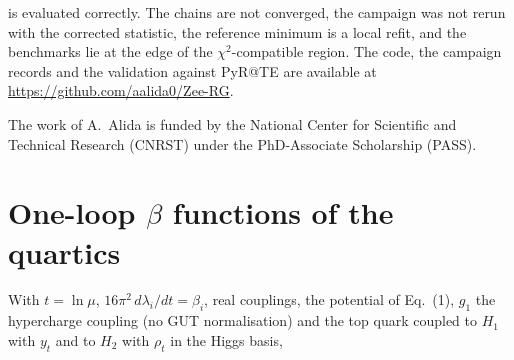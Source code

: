 \documentclass[twocolumn,epjc3]{svjour3}
\begin{document}
is evaluated correctly. The chains are not converged, the campaign was not rerun with the corrected statistic, the reference minimum is a local refit, and the benchmarks lie at the edge of the $\chi^2$-compatible region. The code, the campaign records and the validation against PyR@TE are available at \url{https://github.com/aalida0/Zee-RG}.

\begin{acknowledgements}The work of A.~Alida is funded by the National Center for Scientific and Technical Research (CNRST) under the PhD-Associate Scholarship (PASS).\end{acknowledgements}

\appendix
\section{One-loop $\beta$ functions of the quartics}\label{app:rge}
With $t=\ln\mu$, $16\pi^2\,d\lambda_i/dt=\beta_i$, real couplings, the potential of Eq.~(1), $g_1$ the hypercharge coupling (no GUT normalisation) and the top quark coupled to $H_1$ with $y_t$ and to $H_2$ with $\rho_t$ in the Higgs basis,
\end{document}
